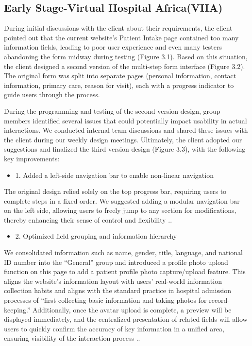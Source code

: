 \subsection{Early Stage-Virtual Hospital Africa(VHA)}
\label{subsec:subsec01}

During initial discussions with the client about their requirements, the client pointed out that the current website's Patient Intake page contained too many information fields, leading to poor user experience and even many testers abandoning the form midway during testing (Figure 3.1). Based on this situation, the client designed a second version of the multi-step form interface (Figure 3.2). The original form was split into separate pages (personal information, contact information, primary care, reason for visit), each with a progress indicator to guide users through the process.

During the programming and testing of the second version design, group members identified several issues that could potentially impact usability in actual interactions. We conducted internal team discussions and shared these issues with the client during our weekly design meetings. Ultimately, the client adopted our suggestions and finalized the third version design (Figure 3.3), with the following key improvements:

\begin{itemize}
    \item 1. Added a left-side navigation bar to enable non-linear navigation
\end{itemize}
The original design relied solely on the top progress bar, requiring users to complete steps in a fixed order. We suggested adding a modular navigation bar on the left side, allowing users to freely jump to any section for modifications, thereby enhancing their sense of control and flexibility \cite{nielsen1995}..

\begin{itemize}
    \item 2. Optimized field grouping and information hierarchy
\end{itemize}
We consolidated information such as name, gender, title, language, and national ID number into the “General” group and introduced a profile photo upload function on this page to add a patient profile photo capture/upload feature. This aligns the website's information layout with users' real-world information collection habits and aligns with the standard practice in hospital admission processes of “first collecting basic information and taking photos for record-keeping.” Additionally, once the avatar upload is complete, a preview will be displayed immediately, and the centralized presentation of related fields will allow users to quickly confirm the accuracy of key information in a unified area, ensuring visibility of the interaction process \cite{nielsen1995}..

